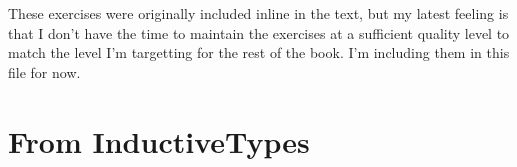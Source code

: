 \documentclass[12pt]{report}
\begin{document}
\begin{coqdoccode}
\coqdocemptyline
\coqdocemptyline
\end{coqdoccode}
These exercises were originally included inline in the text, but my latest feeling is that I don't have the time to maintain the exercises at a sufficient quality level to match the level I'm targetting for the rest of the book.  I'm including them in this file for now. 

\section{From InductiveTypes}
\end{document}
